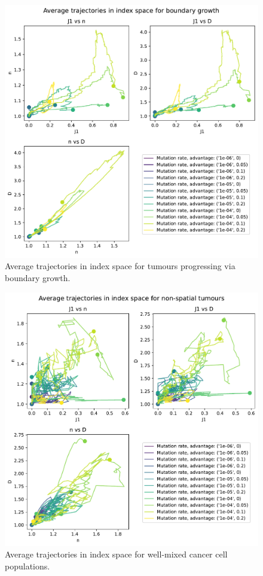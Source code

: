 \begin{figure}
    \centering
    \includegraphics[width=\textwidth]{Chapter_trajectories/figures/indspace-boundary.pdf}
    \caption{Average trajectories in index space for tumours progressing via boundary growth.}
    \label{fig:boundary-indspace}
\end{figure}
\begin{figure}
    \centering
    \includegraphics[width=\textwidth]{Chapter_trajectories/figures/indspace-non-spatial.pdf}
    \caption{Average trajectories in index space for well-mixed cancer cell populations.}
    \label{fig:non-spatial-indspace}
\end{figure}
